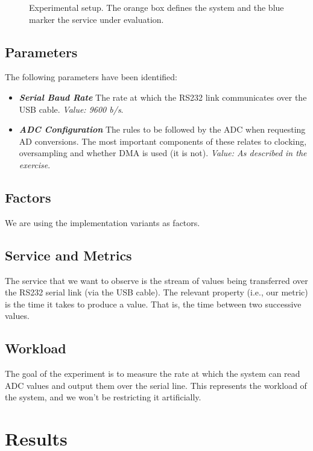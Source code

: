\documentclass[a4paper]{article}
\newcommand{\textdesc}[1]{\textit{\textbf{#1}}}
\newcommand{\descitem}[1]{\item \textdesc{#1}}
\newcommand{\includeSVG}[1]{
  \texttt{[image: ./figs/\#1.pdf]}
}
\begin{document}
\begin{figure}[btp]
  \begin{center}
    \scalebox{0.5}{\includeSVG{setup}}
  \end{center}
  \caption{\label{fig:setup} Experimental setup. The orange box defines the system and the blue marker the service under evaluation.}
\end{figure}

\subsection{Parameters}

The following parameters have been identified:
\begin{itemize}
  \descitem{Serial Baud Rate} The rate at which the RS232 link communicates over the USB cable. \textsl{Value: 9600 b/s}.
  \descitem{ADC Configuration} The rules to be followed by the ADC when requesting AD conversions. The most important components of these relates to clocking, oversampling and whether DMA is used (it is not). \textsl{Value: As described in the exercise}.
\end{itemize}

\subsection{Factors}

We are using the implementation variants as factors.

\subsection{Service and Metrics}

The service that we want to observe is the stream of values being transferred over the RS232 serial link (via the USB cable). The relevant property (i.e., our metric) is the time it takes to produce a value. That is, the time between two successive values.

\subsection{Workload}

The goal of the experiment is to measure the rate at which the system can read ADC values and output them over the serial line. This represents the workload of the system, and we won't be restricting it artificially.

\section{Results}
\end{document}

